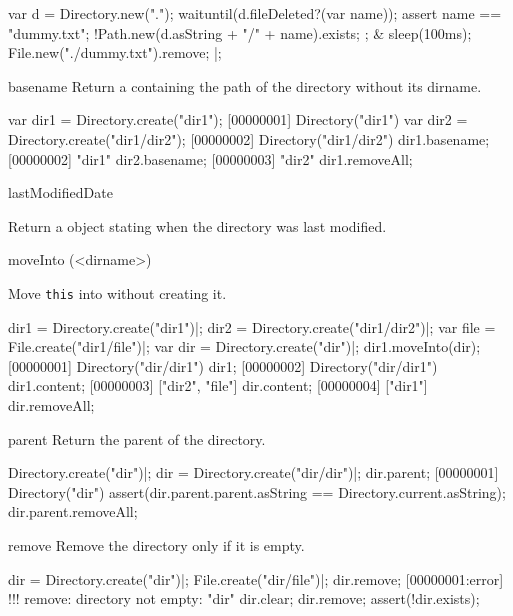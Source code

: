 \begin{urbiscriptapi}
\begin{urbiscript}
  {
    var d = Directory.new(".");
    waituntil(d.fileDeleted?(var name));
    assert
    {
      name == "dummy.txt";
      !Path.new(d.asString + "/" + name).exists;
    };
  }
&
  {
    sleep(100ms);
    File.new("./dummy.txt").remove;
  }|;
\end{urbiscript}

\item[basename]
  Return a  containing the path of the directory without
  its dirname.
\begin{urbiscript}[firstnumber=1]
var dir1 = Directory.create("dir1");
[00000001] Directory("dir1")
var dir2 = Directory.create("dir1/dir2");
[00000002] Directory("dir1/dir2")
dir1.basename;
[00000002] "dir1"
dir2.basename;
[00000003] "dir2"
dir1.removeAll;
\end{urbiscript}

\item[lastModifiedDate]
  \experimental{}

  Return a  object stating when the directory was last modified.

\item[moveInto](<dirname>)
  \experimental{}

  Move \lstinline|this| into  without creating it.
\begin{urbiscript}
dir1 = Directory.create("dir1")|;
dir2 = Directory.create("dir1/dir2")|;
var file = File.create("dir1/file")|;
var dir = Directory.create("dir")|;
dir1.moveInto(dir);
[00000001] Directory("dir/dir1")
dir1;
[00000002] Directory("dir/dir1")
dir1.content;
[00000003] ["dir2", "file"]
dir.content;
[00000004] ["dir1"]
dir.removeAll;
\end{urbiscript}

\item[parent]
  Return the parent of the directory.
\begin{urbiscript}
Directory.create("dir")|;
dir = Directory.create("dir/dir")|;
dir.parent;
[00000001] Directory("dir")
assert(dir.parent.parent.asString == Directory.current.asString);
dir.parent.removeAll;
\end{urbiscript}

\item[remove]
  Remove the directory only if it is empty.
\begin{urbiscript}
dir = Directory.create("dir")|;
File.create("dir/file")|;
dir.remove;
[00000001:error] !!! remove: directory not empty: "dir"
dir.clear;
dir.remove;
assert(!dir.exists);
\end{urbiscript}


\end{urbiscriptapi}
